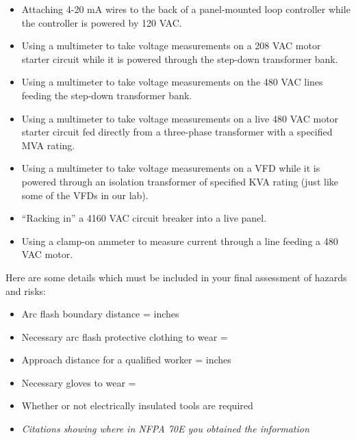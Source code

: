 \begin{itemize}
\item{} Attaching 4-20 mA wires to the back of a panel-mounted loop controller while the controller is powered by 120 VAC.
\vskip 5pt
\item{} Using a multimeter to take voltage measurements on a 208 VAC motor starter circuit while it is powered through the step-down transformer bank.
\vskip 5pt
\item{} Using a multimeter to take voltage measurements on the 480 VAC lines feeding the step-down transformer bank.
\vskip 5pt
\item{} Using a multimeter to take voltage measurements on a live 480 VAC motor starter circuit fed directly from a three-phase transformer with a specified MVA rating.
\vskip 5pt
\item{} Using a multimeter to take voltage measurements on a VFD while it is powered through an isolation transformer of specified KVA rating (just like some of the VFDs in our lab).
\vskip 5pt
\item{} ``Racking in'' a 4160 VAC circuit breaker into a live panel.
\vskip 5pt
\item{} Using a clamp-on ammeter to measure current through a line feeding a 480 VAC motor.
\end{itemize}

\vskip 10pt

Here are some details which must be included in your final assessment of hazards and risks:


\begin{itemize}
\item{} Arc flash boundary distance = \underbar{\hskip 50pt} inches
\vskip 5pt
\item{} Necessary arc flash protective clothing to wear = \underbar{\hskip 50pt}
\vskip 5pt
\item{} Approach distance for a qualified worker = \underbar{\hskip 50pt} inches 
\vskip 5pt
\item{} Necessary gloves to wear = \underbar{\hskip 50pt}
\vskip 5pt
\item{} Whether or not electrically insulated tools are required
\vskip 5pt
\item{} {\it Citations showing where in NFPA 70E you obtained the information}
\end{itemize}
















